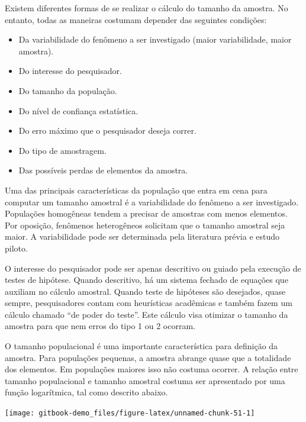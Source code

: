 \documentclass[
]{book}
\providecommand{\tightlist}{%
  \setlength{\itemsep}{0pt}\setlength{\parskip}{0pt}}
\begin{document}
Existem diferentes formas de se realizar o cálculo do tamanho da amostra. No entanto, todas as maneiras costumam depender das seguintes condições:

\begin{itemize}
\tightlist
\item
  Da variabilidade do fenômeno a ser investigado (maior variabilidade, maior amostra).\\
\item
  Do interesse do pesquisador.\\
\item
  Do tamanho da população.\\
\item
  Do nível de confiança estatística.\\
\item
  Do erro máximo que o pesquisador deseja correr.\\
\item
  Do tipo de amostragem.
\item
  Das possíveis perdas de elementos da amostra.
\end{itemize}

Uma das principais características da população que entra em cena para computar um tamanho amostral é a variabilidade do fenômeno a ser investigado. Populações homogêneas tendem a precisar de amostras com menos elementos. Por oposição, fenômenos heterogêneos solicitam que o tamanho amostral seja maior. A variabilidade pode ser determinada pela literatura prévia e estudo piloto.

O interesse do pesquisador pode ser apenas descritivo ou guiado pela execução de testes de hipótese. Quando descritivo, há um sistema fechado de equações que auxiliam no cálculo amostral. Quando teste de hipóteses são desejados, quase sempre, pesquisadores contam com heurísticas acadêmicas e também fazem um cálculo chamado ``de poder do teste''. Este cálculo visa otimizar o tamanho da amostra para que nem erros do tipo 1 ou 2 ocorram.

O tamanho populacional é uma importante característica para definição da amostra. Para populações pequenas, a amostra abrange quase que a totalidade dos elementos. Em populações maiores isso não costuma ocorrer. A relação entre tamanho populacional e tamanho amostral costuma ser apresentado por uma função logarítmica, tal como descrito abaixo.

\begin{center}\texttt{[image: gitbook-demo\_files/figure-latex/unnamed-chunk-51-1]} \end{center}
\end{document}
